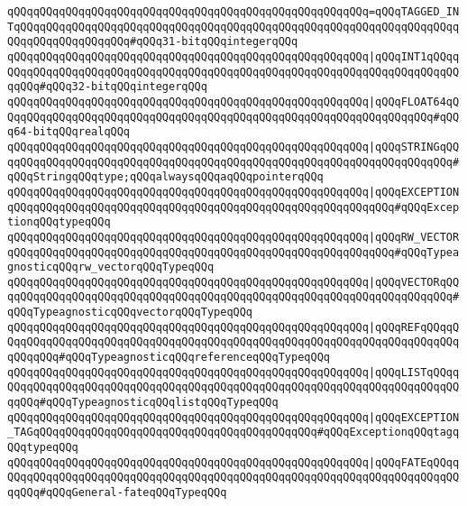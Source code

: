 \verb|qQQqqQQqqQQqqQQqqQQqqQQqqQQqqQQqqQQqqQQqqQQqqQQqqQQqqQQq=qQQqTAGGED_INTqQQqqQQqqQQqqQQqqQQqqQQqqQQqqQQqqQQqqQQqqQQqqQQqqQQqqQQqqQQqqQQqqQQqqQQqqQQqqQQqqQQqqQQq#qQQq31-bitqQQqintegerqQQq|\newline
\verb|qQQqqQQqqQQqqQQqqQQqqQQqqQQqqQQqqQQqqQQqqQQqqQQqqQQqqQQq|\verb#|qQQqINT1qQQqqQQqqQQqqQQqqQQqqQQqqQQqqQQqqQQqqQQqqQQqqQQqqQQqqQQqqQQqqQQqqQQqqQQqqQQqqQQq#\verb|#qQQq32-bitqQQqintegerqQQq|\newline
\verb|qQQqqQQqqQQqqQQqqQQqqQQqqQQqqQQqqQQqqQQqqQQqqQQqqQQqqQQq|\verb#|qQQqFLOAT64qQQqqQQqqQQqqQQqqQQqqQQqqQQqqQQqqQQqqQQqqQQqqQQqqQQqqQQqqQQqqQQqqQQq#\verb|#qQQq64-bitqQQqrealqQQq|\newline
\verb|qQQqqQQqqQQqqQQqqQQqqQQqqQQqqQQqqQQqqQQqqQQqqQQqqQQqqQQq|\verb#|qQQqSTRINGqQQqqQQqqQQqqQQqqQQqqQQqqQQqqQQqqQQqqQQqqQQqqQQqqQQqqQQqqQQqqQQqqQQqqQQq#\verb|#qQQqStringqQQqtype;qQQqalwaysqQQqaqQQqpointerqQQq|\newline
\verb|qQQqqQQqqQQqqQQqqQQqqQQqqQQqqQQqqQQqqQQqqQQqqQQqqQQqqQQq|\verb#|qQQqEXCEPTIONqQQqqQQqqQQqqQQqqQQqqQQqqQQqqQQqqQQqqQQqqQQqqQQqqQQqqQQqqQQq#\verb|#qQQqExceptionqQQqtypeqQQq|\newline
\newline
\verb|qQQqqQQqqQQqqQQqqQQqqQQqqQQqqQQqqQQqqQQqqQQqqQQqqQQqqQQq|\verb#|qQQqRW_VECTORqQQqqQQqqQQqqQQqqQQqqQQqqQQqqQQqqQQqqQQqqQQqqQQqqQQqqQQqqQQq#\verb|#qQQqTypeagnosticqQQqrw_vectorqQQqTypeqQQq|\newline
\verb|qQQqqQQqqQQqqQQqqQQqqQQqqQQqqQQqqQQqqQQqqQQqqQQqqQQqqQQq|\verb#|qQQqVECTORqQQqqQQqqQQqqQQqqQQqqQQqqQQqqQQqqQQqqQQqqQQqqQQqqQQqqQQqqQQqqQQqqQQqqQQq#\verb|#qQQqTypeagnosticqQQqvectorqQQqTypeqQQq|\newline
\verb|qQQqqQQqqQQqqQQqqQQqqQQqqQQqqQQqqQQqqQQqqQQqqQQqqQQqqQQq|\verb#|qQQqREFqQQqqQQqqQQqqQQqqQQqqQQqqQQqqQQqqQQqqQQqqQQqqQQqqQQqqQQqqQQqqQQqqQQqqQQqqQQqqQQqqQQq#\verb|#qQQqTypeagnosticqQQqreferenceqQQqTypeqQQq|\newline
\verb|qQQqqQQqqQQqqQQqqQQqqQQqqQQqqQQqqQQqqQQqqQQqqQQqqQQqqQQq|\verb#|qQQqLISTqQQqqQQqqQQqqQQqqQQqqQQqqQQqqQQqqQQqqQQqqQQqqQQqqQQqqQQqqQQqqQQqqQQqqQQqqQQqqQQq#\verb|#qQQqTypeagnosticqQQqlistqQQqTypeqQQq|\newline
\verb|qQQqqQQqqQQqqQQqqQQqqQQqqQQqqQQqqQQqqQQqqQQqqQQqqQQqqQQq|\verb#|qQQqEXCEPTION_TAGqQQqqQQqqQQqqQQqqQQqqQQqqQQqqQQqqQQqqQQqqQQq#\verb|#qQQqExceptionqQQqtagqQQqtypeqQQq|\newline
\newline
\verb|qQQqqQQqqQQqqQQqqQQqqQQqqQQqqQQqqQQqqQQqqQQqqQQqqQQqqQQq|\verb#|qQQqFATEqQQqqQQqqQQqqQQqqQQqqQQqqQQqqQQqqQQqqQQqqQQqqQQqqQQqqQQqqQQqqQQqqQQqqQQqqQQqqQQq#\verb|#qQQqGeneral-fateqQQqTypeqQQq|\newline
